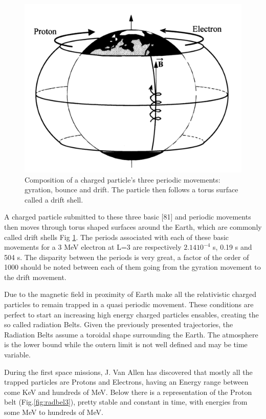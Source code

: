 \documentclass[./dissertation.tex]{subfiles}
\begin{document}
\begin{figure}[h!]
\centering
  \includegraphics[scale = 0.50]{imgs/radbelt2.png}
  \caption{Composition of a charged particle's three periodic movements: gyration, bounce and drift. The particle then follows a torus surface called a drift shell. \cite{bib2}}
  \label{fig:radbel2}
\end{figure}

A charged particle submitted to these three basic [81] and
periodic movements then moves through torus shaped surfaces
around the Earth, which are commonly called drift shells Fig \ref{fig:radbel2}. The periods associated with each of these basic
movements for a 3 MeV electron at L=3 are respectively $2.14 10^{-4}$
s, 0.19 s and 504 s. The disparity between the periods is
very great, a factor of the order of 1000 should be noted
between each of them going from the gyration movement to
the drift movement.

Due to the magnetic field in proximity of Earth make all the relativistic charged particles to remain trapped in a quasi periodic movement. These conditions are perfect to start an increasing high energy charged particles ensables, creating the so called radiation Belts.
Given the previously presented trajectories, the Radiation Belts assume a toroidal shape surrounding the Earth. The atmosphere is the lower bound while the outern limit is not well defined and may be time variable.

During the first space missions, J. Van Allen has discovered that mostly all the trapped particles are Protons and Electrons, having an Energy range between come KeV and hundreds of MeV. Below there is a representation of the Proton belt (Fig.\ref{fig:radbel3}), pretty stable and constant in time, with energies from some MeV to hundreds of MeV.
\end{document}
